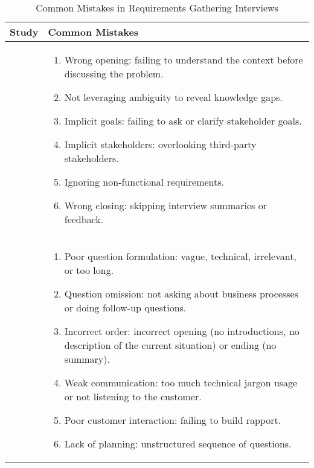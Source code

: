     
\begin{table}[h!]
    \centering
    \small
    \renewcommand{\arraystretch}{1.2}
    \begin{tabular}{|>{\arraybackslash}m{}|>{\arraybackslash}m{}|}
    \hline
    \textbf{Study} & \textbf{Common Mistakes} \\ \hline
    
    \textcite{interviews1} & 
    \vspace{-\topsep}
    \begin{enumerate}
        \item Wrong opening: failing to understand the context before discussing the problem.
        \item Not leveraging ambiguity to reveal knowledge gaps.
        \item Implicit goals: failing to ask or clarify stakeholder goals.
        \item Implicit stakeholders: overlooking third-party stakeholders.
        \item Ignoring non-functional requirements.
        \item Wrong closing: skipping interview summaries or feedback.
    \end{enumerate} \\ \hline
    
    \textcite{interviews2} & 
    \vspace{-\topsep}
    \begin{enumerate}
        \item Poor question formulation: vague, technical, irrelevant, or too long.
        \item Question omission: not asking about business processes or doing follow-up questions.
        \item Incorrect order:  incorrect opening (no introductions, no description of the current situation) or ending (no summary).
        \item Weak communication: too much technical jargon usage or not listening to the customer.
        \item Poor customer interaction: failing to build rapport.
        \item Lack of planning: unstructured sequence of questions.
    \end{enumerate} \\ \hline
    
    \end{tabular}
    \caption{Common Mistakes in Requirements Gathering Interviews}
    \label{tab:common_mistakes}
\end{table}


